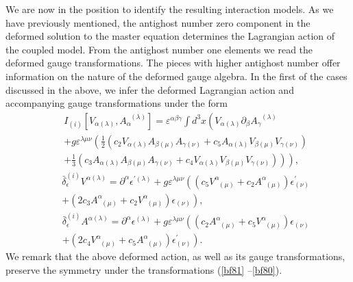 \documentclass[a4paper,11pt]{article}
\begin{document}
We are now in the position to identify the resulting interaction models. As
we have previously mentioned, the antighost number zero component in the
deformed solution to the master equation determines the Lagrangian action of
the coupled model. From the antighost number one elements we read the
deformed gauge transformations. The pieces with higher antighost number
offer information on the nature of the deformed gauge algebra. In the first
of the cases discussed in the above, we infer the deformed Lagrangian action
and accompanying gauge transformations under the form
\begin{eqnarray}
&&I_{(i)}\left[ V_{\alpha (\lambda )},A_{\alpha }^{\;\;(\lambda )}\right]
=\varepsilon ^{\alpha \beta \gamma }\int d^{3}x\left( V_{\alpha (\lambda
)}\partial _{\beta }A_{\gamma }^{\;\;(\lambda )}\right.  \nonumber \\
&&+g\varepsilon ^{\lambda \mu \nu }\left( \frac{1}{2}\left( c_{2}V_{\alpha
(\lambda )}A_{\beta (\mu )}A_{\gamma (\nu )}+c_{5}A_{\alpha (\lambda
)}V_{\beta (\mu )}V_{\gamma (\nu )}\right) \right.  \nonumber \\
&&\left. \left. +\frac{1}{3}\left( c_{3}A_{\alpha (\lambda )}A_{\beta (\mu
)}A_{\gamma (\nu )}+c_{4}V_{\alpha (\lambda )}V_{\beta (\mu )}V_{\gamma (\nu
)}\right) \right) \right) ,  \label{bf95}
\end{eqnarray}
\begin{eqnarray}
&&\bar{\delta}_{\epsilon }^{(i)}V^{\alpha (\lambda )}=\partial ^{\alpha
}\epsilon ^{\prime (\lambda )}+g\varepsilon ^{\lambda \mu \nu }\left( \left(
c_{5}V_{\;\;(\mu )}^{\alpha }+c_{2}A_{\;\;(\mu )}^{\alpha }\right) \epsilon
_{(\nu )}^{\prime }\right.  \nonumber \\
&&\left. +\left( 2c_{3}A_{\;\;(\mu )}^{\alpha }+c_{2}V_{\;\;(\mu )}^{\alpha
}\right) \epsilon _{(\nu )}\right) ,  \label{bf96}
\end{eqnarray}
\begin{eqnarray}
&&\bar{\delta}_{\epsilon }^{(i)}A^{\alpha (\lambda )}=\partial ^{\alpha
}\epsilon ^{(\lambda )}+g\varepsilon ^{\lambda \mu \nu }\left( \left(
c_{2}A_{\;\;(\mu )}^{\alpha }+c_{5}V_{\;\;(\mu )}^{\alpha }\right) \epsilon
_{(\nu )}\right.  \nonumber \\
&&\left. +\left( 2c_{4}V_{\;\;(\mu )}^{\alpha }+c_{5}A_{\;\;(\mu )}^{\alpha
}\right) \epsilon _{(\nu )}^{\prime }\right) .  \label{bf97}
\end{eqnarray}
We remark that the above deformed action, as well as its gauge
transformations, preserve the symmetry under the transformations (\ref{bf81}%
--\ref{bf80}).
\end{document}
